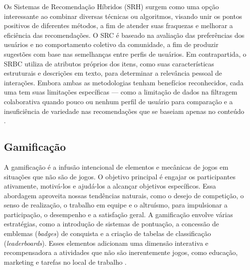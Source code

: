 Os Sistemas de Recomendação Híbridos (SRH) surgem como uma opção interessante ao combinar diversas técnicas ou algoritmos, visando unir os pontos positivos de diferentes métodos, a fim de atender suas fraquezas e melhorar a eficiência das recomendações. O SRC é baseado na avaliação das preferências dos usuários e no comportamento coletivo da comunidade, a fim de produzir sugestões com base nas semelhanças entre perfis de usuários. Em contrapartida, o SRBC utiliza de atributos próprios dos itens, como suas características estruturais e descrições em texto, para determinar a relevância pessoal de interações. Embora ambas as metodologias tenham benefícios reconhecidos, cada uma tem suas limitações específicas — como a limitação de dados na filtragem colaborativa quando pouco ou nenhum perfil de usuário para comparação e a insuficiência de variedade nas recomendações que se baseiam apenas no conteúdo \cite{Jannach2011}.


\subsection[Gamificação]{Gamificação}
\label{sec:gamificacao}

A gamificação é a infusão intencional de elementos e mecânicas de jogos em situações que não são de jogos. O objetivo principal é engajar os participantes ativamente, motivá-los e ajudá-los a alcançar objetivos específicos. Essa abordagem aproveita nossas tendências naturais, como o desejo de competição, o senso de realização, o trabalho em equipe e o altruísmo, para impulsionar a participação, o desempenho e a satisfação geral. A gamificação envolve várias estratégias, como a introdução de sistemas de pontuação, a concessão de emblemas (\textit{badges}) de conquista e a criação de tabelas de classificação (\textit{leaderboards}). Esses elementos adicionam uma dimensão interativa e recompensadora a atividades que não são inerentemente jogos, como educação, marketing e tarefas no local de trabalho \cite{deliyannis2023gamification}.

